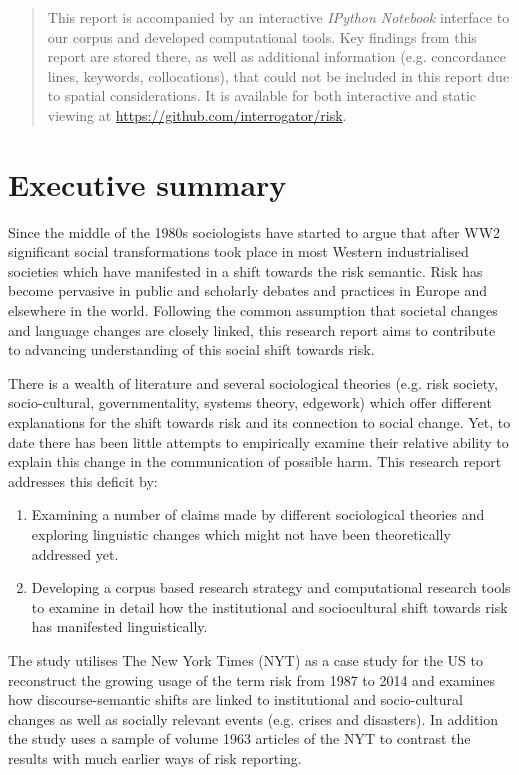 \documentclass{report}
\begin{document}
\begin{abstract}
This report is accompanied by an interactive \emph{IPython Notebook} interface to our corpus and developed computational tools. Key findings from this report are stored there, as well as additional information (e.g. concordance lines, keywords, collocations), that could not be included in this report due to spatial considerations. It is available for both interactive and static viewing at \url{https://github.com/interrogator/risk}.

\end{abstract}
\cleardoublepage
{}
\singlespacing
\tableofcontents
\cleardoublepage
\listoftables
\cleardoublepage
\listoffigures
\cleardoublepage
\onehalfspacing
{}

\section*{Executive summary}

\noindent Since the middle of the 1980s sociologists have started to argue that after WW2 significant social transformations took place in most Western industrialised societies which have manifested in a shift towards the risk semantic. Risk has become pervasive in public and scholarly debates and practices in Europe and elsewhere in the world. Following the common assumption that societal changes and language changes are closely linked, this research report aims to contribute to advancing understanding of this social shift towards risk. 

There is a wealth of literature and several sociological theories (e.g. risk society, socio-cultural, governmentality, systems theory, edgework) which offer different explanations for the shift towards risk and its connection to social change. Yet, to date there has been little attempts to empirically examine their relative ability to explain this change in the communication of possible harm. This research report addresses this deficit by:
%
\begin{enumerate}
\item Examining a number of claims made by different sociological theories and exploring linguistic changes which might not have been theoretically addressed yet. 
\item Developing a corpus based research strategy and computational research tools to examine in detail how the institutional and sociocultural shift towards risk has manifested linguistically.
\end{enumerate}
%
The study utilises The New York Times (NYT) as a case study for the US to reconstruct the growing usage of the term risk from 1987 to 2014 and examines how discourse-semantic shifts are linked to institutional and socio-cultural changes as well as socially relevant events (e.g. crises and disasters). In addition the study uses a sample of volume 1963 articles of the NYT to contrast the results with much earlier ways of risk reporting.
\end{document}
